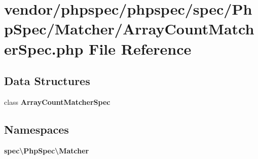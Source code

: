 \section{vendor/phpspec/phpspec/spec/\+Php\+Spec/\+Matcher/\+Array\+Count\+Matcher\+Spec.php File Reference}
\label{_array_count_matcher_spec_8php}
\subsection*{Data Structures}
\begin{DoxyCompactItemize}
\item 
class {\bf Array\+Count\+Matcher\+Spec}
\end{DoxyCompactItemize}
\subsection*{Namespaces}
\begin{DoxyCompactItemize}
\item 
 {\bf spec\textbackslash{}\+Php\+Spec\textbackslash{}\+Matcher}
\end{DoxyCompactItemize}
